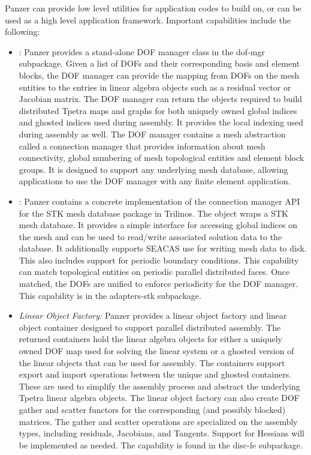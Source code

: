 Panzer can provide low level utilities for application codes to build on, or can be used as a high level application framework. Important capabilities include the following:
\begin{itemize}
\item {}: Panzer provides a stand-alone DOF manager class in the dof-mgr subpackage. Given a list of DOFs and their corresponding basis and element blocks, the DOF manager can provide the mapping from DOFs on the mesh entities to the entries in linear algebra objects such as a residual vector or Jacobian matrix. The DOF manager can return the objects required to build distributed Tpetra 
maps and graphs for both uniquely owned global indices and ghosted indices used during assembly. 
It provides the local indexing used during assembly as well. The DOF manager contains a mesh abstraction called a connection manager that provides information about mesh connectivity, global numbering of mesh topological entities and element block groups. It is designed to support any underlying mesh database, allowing applications to use the DOF manager with any finite element application.
\item {}: Panzer contains a concrete implementation of the connection manager API for the STK mesh database package in Trilinos. The  object wraps a STK mesh database. It provides a simple interface for accessing global indices on the mesh and can be used to read/write associated solution data to the database. It additionally supports SEACAS use for writing mesh data to disk. This  also includes support for periodic boundary conditions.  This capability can match topological entities on periodic parallel distributed faces. Once matched, the DOFs are unified to enforce periodicity for the DOF manager. This capability is in the adapters-stk subpackage.
\item \emph{Linear Object Factory:} Panzer provides a linear object factory and linear object container designed to support parallel distributed assembly. 
The returned containers hold the linear algebra objects for either a uniquely owned DOF map used for solving the linear system or a ghosted version of the linear objects that can be used for assembly. The containers support export and import operations between the unique and ghosted containers. These are used to simplify the assembly process and abstract the underlying Tpetra linear algebra objects. %
The linear object factory can also create DOF gather and scatter functors for the corresponding (and possibly blocked) matrices. The gather and scatter operations are specialized on the assembly types, including residuals, Jacobians, and Tangents.
Support for Hessians will be implemented as needed.
The capability is found in the disc-fe subpackage.


\end{itemize}
